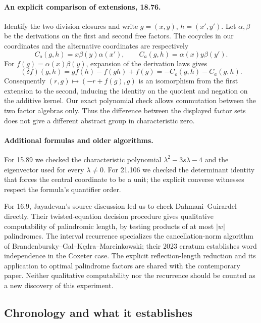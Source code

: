 \paragraph{An explicit comparison of extensions, 18.76.}
Identify the two division closures and write \(g=(x,y)\),
\(h=(x',y')\). Let \(\alpha,\beta\) be the derivations on the first
and second free factors. The cocycles in our coordinates and the
alternative coordinates are respectively
\[
 C_o(g,h)=x\beta(y)\alpha(x'),\qquad
 C_a(g,h)=\alpha(x)y\beta(y').
\]
For \(f(g)=\alpha(x)\beta(y)\), expansion of the derivation laws gives
\[
 (\delta f)(g,h)=g f(h)-f(gh)+f(g)=-C_o(g,h)-C_a(g,h).
\]
Consequently \((r,g)\mapsto(-r+f(g),g)\) is an isomorphism from
the first extension to the second, inducing the identity on the quotient
and negation on the additive kernel. Our exact polynomial check allows
commutation between the two factor algebras only. Thus the difference
between the displayed factor sets does not give a different abstract
group in characteristic zero.

\paragraph{Additional formulas and older algorithms.}
For 15.89 we checked the characteristic polynomial
\(\lambda^2-3s\lambda-4\) and the eigenvector used for every
\(\lambda\ne0\). For 21.106 we checked the determinant identity
that forces the central coordinate to be a unit; the explicit converse
witnesses respect the formula's quantifier order.

For 16.9, Jayadevan's source discussion led us to check
Dahmani--Guirardel\cite[Theorem~4]{dahmani-guirardel-equations} directly.
Their twisted-equation decision procedure gives qualitative computability
of palindromic length, by testing products of at most \(|w|\) palindromes.
The interval recurrence specializes the cancellation-norm algorithm of
Brandenbursky--Gal--K\k{e}dra--Marcinkowski\cite[Section~2.I]{cancellation-norm};
their 2023 erratum establishes word independence in the Coxeter case.
The explicit reflection-length reduction and its application to optimal
palindrome factors are shared with the contemporary paper. Neither
qualitative computability nor the recurrence should be counted as a new
discovery of this experiment.

\subsection{Chronology and what it establishes}

